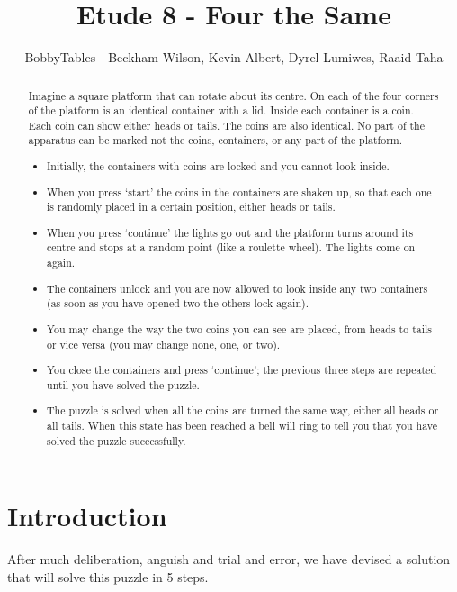 \documentclass{article}
\title{Etude 8 - Four the Same}
\author{BobbyTables - Beckham Wilson, Kevin Albert, Dyrel Lumiwes, Raaid Taha}
\begin{document}
\maketitle

\begin{abstract} Imagine a square platform that can rotate about its centre. On each of the four corners
of the platform is an identical container with a lid. Inside each container is a coin.
Each coin can show either heads or tails. The coins are also identical. No part of the
apparatus can be marked not the coins, containers, or any part of the platform. \\

\begin{itemize}
    \item Initially, the containers with coins are locked and you cannot look inside.
    \item When you press ‘start’ the coins in the containers are shaken up, so that each one is randomly placed in a certain position, either heads or tails.
    \item When you press ‘continue’ the lights go out and the platform turns around its centre and stops at a random point (like a roulette wheel). The lights come on again.
    \item The containers unlock and you are now allowed to look inside any two containers (as soon as you have opened two the others lock again).
    \item You may change the way the two coins you can see are placed, from heads to tails or vice versa (you may change none, one, or two).
    \item You close the containers and press ‘continue’; the previous three steps are repeated until you have solved the puzzle.
    \item The puzzle is solved when all the coins are turned the same way, either all heads or all tails. When this state has been reached a bell will ring to tell you that you have solved the puzzle successfully.
\end{itemize}
\end{abstract}

\section{Introduction}

After much deliberation, anguish and trial and error, we have devised a solution that will solve this puzzle in 5 steps.
\end{document}
